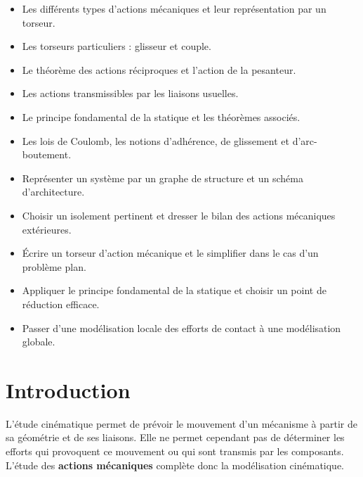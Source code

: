 
\begin{savoirs}
\begin{itemize}
  \item Les différents types d'actions mécaniques et leur représentation par un torseur.
  \item Les torseurs particuliers : glisseur et couple.
  \item Le théorème des actions réciproques et l'action de la pesanteur.
  \item Les actions transmissibles par les liaisons usuelles.
  \item Le principe fondamental de la statique et les théorèmes associés.
  \item Les lois de Coulomb, les notions d'adhérence, de glissement et d'arc-boutement.
\end{itemize}
\end{savoirs}

\begin{savoirfaire}
\begin{itemize}
  \item Représenter un système par un graphe de structure et un schéma d'architecture.
  \item Choisir un isolement pertinent et dresser le bilan des actions mécaniques extérieures.
  \item Écrire un torseur d'action mécanique et le simplifier dans le cas d'un problème plan.
  \item Appliquer le principe fondamental de la statique et choisir un point de réduction efficace.
  \item Passer d'une modélisation locale des efforts de contact à une modélisation globale.
\end{itemize}
\end{savoirfaire}

\section{Introduction}

L'étude cinématique permet de prévoir le mouvement d'un mécanisme à partir de sa géométrie et de ses liaisons. Elle ne permet cependant pas de déterminer les efforts qui provoquent ce mouvement ou qui sont transmis par les composants. L'étude des \textbf{actions mécaniques} complète donc la modélisation cinématique.

